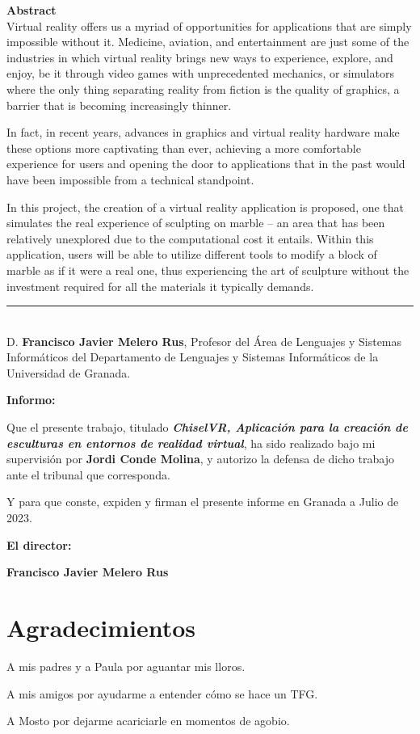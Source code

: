\noindent\textbf{Abstract}\\
Virtual reality offers us a myriad of opportunities for applications that are simply impossible without it. Medicine, aviation, and entertainment are just some of the industries in which virtual reality brings new ways to experience, explore, and enjoy, be it through video games with unprecedented mechanics, or simulators where the only thing separating reality from fiction is the quality of graphics, a barrier that is becoming increasingly thinner.

In fact, in recent years, advances in graphics and virtual reality hardware make these options more captivating than ever, achieving a more comfortable experience for users and opening the door to applications that in the past would have been impossible from a technical standpoint.

In this project, the creation of a virtual reality application is proposed, one that simulates the real experience of sculpting on marble – an area that has been relatively unexplored due to the computational cost it entails. Within this application, users will be able to utilize different tools to modify a block of marble as if it were a real one, thus experiencing the art of sculpture without the investment required for all the materials it typically demands.

\cleardoublepage

\thispagestyle{empty}

\noindent\rule[-1ex]{\textwidth}{2pt}\\[4.5ex]

D. \textbf{Francisco Javier Melero Rus}, Profesor del Área de Lenguajes y Sistemas Informáticos del Departamento de Lenguajes y Sistemas Informáticos de la Universidad de Granada.

\vspace{0.5cm}

\textbf{Informo:}

\vspace{0.5cm}

Que el presente trabajo, titulado \textit{\textbf{ChiselVR, Aplicación para la creación de esculturas en entornos de realidad virtual}},
ha sido realizado bajo mi supervisión por \textbf{Jordi Conde Molina}, y autorizo la defensa de dicho trabajo ante el tribunal
que corresponda.

\vspace{0.5cm}

Y para que conste, expiden y firman el presente informe en Granada a Julio de 2023.

\vspace{1cm}

\textbf{El director: }

\vspace{5cm}

\noindent \textbf{Francisco Javier Melero Rus}

\chapter*{Agradecimientos}

A mis padres y a Paula por aguantar mis lloros.

A mis amigos por ayudarme a entender cómo se hace un TFG.

A Mosto por dejarme acariciarle en momentos de agobio.




